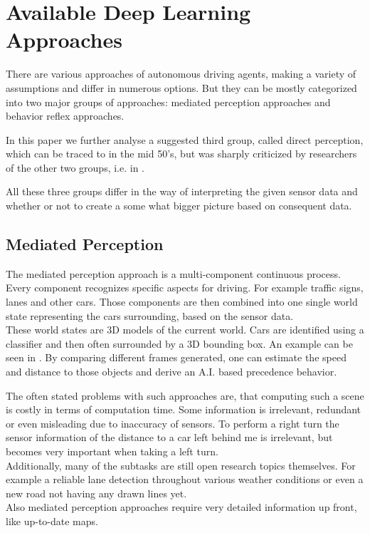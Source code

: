 \chapter{Available Deep Learning Approaches}\label{chapter: Deep Learning Approaches}

There are various approaches of autonomous driving agents, making a variety of assumptions and differ in numerous options. But they can be mostly categorized into two major groups of approaches: mediated perception approaches and behavior reflex approaches. \cite{chen2015deepdriving}

In this paper we further analyse a suggested third group, called direct perception, which can be traced to \cite{gibson1979ecological} in the mid 50's, but was sharply criticized by researchers of the other two groups, i.e. in \cite{ullman1980against}.

All these three groups differ in the way of interpreting the given sensor data and whether or not to create a some what bigger picture based on consequent data.

\section{Mediated Perception} \label{sec: Mediated Perception}

The mediated perception approach is a multi-component continuous process. Every component recognizes specific aspects for driving. For example traffic signs, lanes and other cars. Those components are then combined into one single world state representing the cars surrounding, based on the sensor data. \cite{KITTI}\\
These world states are 3D models of the current world. Cars are identified using a classifier and then often surrounded by a 3D bounding box. An example can be seen in . By comparing different frames generated, one can estimate the speed and distance to those objects and derive an A.I. based precedence behavior. \cite{KITTI}\cite{chen2015deepdriving}

The often stated problems with such approaches are, that computing such a scene is costly in terms of computation time. Some information is irrelevant, redundant or even misleading due to inaccuracy of sensors. To perform a right turn the sensor information of the distance to a car left behind me is irrelevant, but becomes very important when taking a left turn.\\
Additionally, many of the subtasks are still open research topics themselves. For example a reliable lane detection throughout various weather conditions or even a new road not having any drawn lines yet. \cite{aly2008real}\\
Also mediated perception approaches require very detailed information up front, like up-to-date maps.

